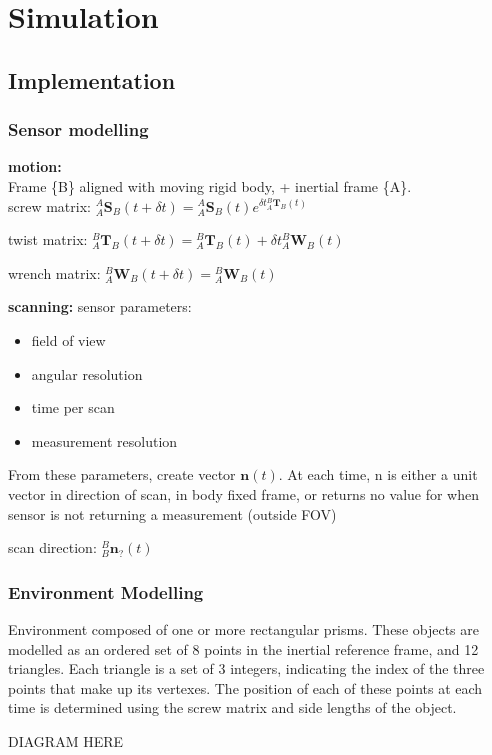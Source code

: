 \chapter{Simulation}
\section{Implementation}
\subsection{Sensor modelling}
\textbf{motion:}\\
Frame \{B\} aligned with moving rigid body, + inertial frame \{A\}.\\
screw matrix: ${^{A}_{A}\mathbf{S}^{}_{B}}(t+\delta t) = {^{A}_{A}\mathbf{S}^{}_{B}(t)}e^{\delta t {^{B}_{A}\mathbf{T}^{}_{B}(t)}}$
			
twist matrix: ${^{B}_{A}\mathbf{T}^{}_{B}}(t+\delta t) = {^{B}_{A}\mathbf{T}^{}_{B}(t)} + \delta t {^{B}_{A}\mathbf{W}^{}_{B}(t)}$

wrench matrix: ${^{B}_{A}\mathbf{W}^{}_{B}}(t+\delta t) = {^{B}_{A}\mathbf{W}^{}_{B}(t)}$

\textbf{scanning:}
sensor parameters:
\begin{itemize}
\item field of view
\item angular resolution
\item time per scan
\item measurement resolution
\end{itemize}
From these parameters, create vector $\mathbf{n}(t)$. At each time, n is either a unit vector in direction of scan, in body fixed frame, or returns no value for when sensor is not returning a measurement (outside FOV)

scan direction: ${^{B}_{B}\mathbf{n}^{}_{?}}(t)$

\subsection{Environment Modelling}
Environment composed of one or more rectangular prisms. These objects are modelled as an ordered set of 8 points in the inertial reference frame, and 12 triangles. Each triangle is a set of 3 integers, indicating the index of the three points that make up its vertexes.
The position of each of these points at each time is determined using the screw matrix and side lengths of the object.

DIAGRAM HERE

